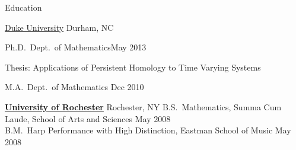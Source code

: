 \documentclass{resume} %
\begin{document}

\begin{rSection}{Education}

\college
{\href{http://www.duke.edu/}{Duke University}}
{Durham, NC}
\begin{DegreeList}{Ph.D.~Dept.~of Mathematics}{May 2013}
 \item Thesis: Applications of Persistent Homology to Time Varying Systems
\end{DegreeList}
\Degree
{M.A.~Dept.~of Mathematics}
{Dec 2010}


\college
{\href{http://www.rochester.edu}{\textbf{University of Rochester}}}
{Rochester, NY}
\Degree
{B.S.~Mathematics, Summa Cum Laude, School of Arts and Sciences}
{May 2008}\\
\Degree
{B.M.~Harp Performance with High Distinction,  Eastman School of Music}
{May 2008}





\end{rSection}

\end{document}
